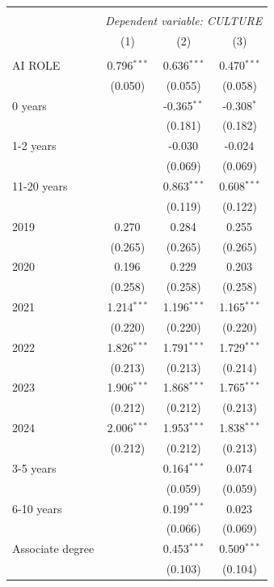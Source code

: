 \begin{table}[!htbp] \centering
\begin{tabular}{@{\extracolsep{5pt}}lccc}
\\[-1.8ex]\hline
\hline \\[-1.8ex]
& \multicolumn{3}{c}{\textit{Dependent variable: CULTURE}} \
\cr \cline{2-4}
\\[-1.8ex] & (1) & (2) & (3) \\
\hline \\[-1.8ex]
 AI ROLE & 0.796$^{***}$ & 0.636$^{***}$ & 0.470$^{***}$ \\
& (0.050) & (0.055) & (0.058) \\
 0 years & & -0.365$^{**}$ & -0.308$^{*}$ \\
& & (0.181) & (0.182) \\
 1-2 years & & -0.030$^{}$ & -0.024$^{}$ \\
& & (0.069) & (0.069) \\
 11-20 years & & 0.863$^{***}$ & 0.608$^{***}$ \\
& & (0.119) & (0.122) \\
 2019 & 0.270$^{}$ & 0.284$^{}$ & 0.255$^{}$ \\
& (0.265) & (0.265) & (0.265) \\
 2020 & 0.196$^{}$ & 0.229$^{}$ & 0.203$^{}$ \\
& (0.258) & (0.258) & (0.258) \\
 2021 & 1.214$^{***}$ & 1.196$^{***}$ & 1.165$^{***}$ \\
& (0.220) & (0.220) & (0.220) \\
 2022 & 1.826$^{***}$ & 1.791$^{***}$ & 1.729$^{***}$ \\
& (0.213) & (0.213) & (0.214) \\
 2023 & 1.906$^{***}$ & 1.868$^{***}$ & 1.765$^{***}$ \\
& (0.212) & (0.212) & (0.213) \\
 2024 & 2.006$^{***}$ & 1.953$^{***}$ & 1.838$^{***}$ \\
& (0.212) & (0.212) & (0.213) \\
 3-5 years & & 0.164$^{***}$ & 0.074$^{}$ \\
& & (0.059) & (0.059) \\
 6-10 years & & 0.199$^{***}$ & 0.023$^{}$ \\
& & (0.066) & (0.069) \\
 Associate degree & & 0.453$^{***}$ & 0.509$^{***}$ \\
& & (0.103) & (0.104) \\

\end{tabular}
\end{table}
